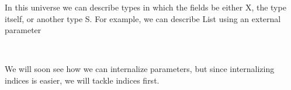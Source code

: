 In this universe we can describe types in which the fields be either X, the type itself, or another type S. For example, we can describe List using an external parameter
\begin{code}%
%
\>[2]\AgdaSpace{}%
\AgdaSymbol{:}\AgdaSpace{}%
\AgdaSpace{}%
\AgdaSpace{}%
\<%
\\
%
\>[2]\AgdaSpace{}%
\AgdaSpace{}%
\AgdaSymbol{=}\AgdaSpace{}%
\AgdaSpace{}%
\AgdaSpace{}%
\AgdaSymbol{(}\AgdaSpace{}%
\AgdaSpace{}%
\AgdaSpace{}%
\AgdaBound{\AgdaUnderscore{}}\AgdaSpace{}%
\AgdaSpace{}%
\AgdaSpace{}%
\AgdaSymbol{)}\<%
\end{code}
We will soon see how we can internalize parameters, but since internalizing indices is easier, we will tackle indices first.

